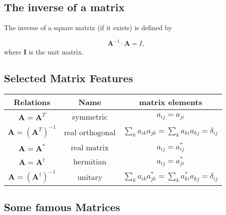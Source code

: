 \subsection{The inverse of a matrix}
\begin{block}{}
The inverse of a square matrix (if it exists) is defined by

\[
\bm{A}^{-1} \cdot \bm{A} = I,
\]
where $\bm{I}$ is the unit matrix.
\end{block}

\subsection{Selected Matrix Features}


{\footnotesize
\begin{tabular}{ccc}
\hline
\multicolumn{1}{c}{ Relations } & \multicolumn{1}{c}{ Name } & \multicolumn{1}{c}{ matrix elements } \\
\hline
$\bm{A} = \bm{A}^{T}$                            & symmetric       & $a_{ij} = a_{ji}$                                                       \\
$\bm{A} = \left (\bm{A}^{T} \right )^{-1}$       & real orthogonal & $\sum_k a_{ik} a_{jk} = \sum_k a_{ki} a_{kj} = \delta_{ij}$             \\
$\bm{A} = \bm{A}^{ * }$                          & real matrix     & $a_{ij} = a_{ij}^{ * }$                                                 \\
$\bm{A} = \bm{A}^{\dagger}$                      & hermitian       & $a_{ij} = a_{ji}^{ * }$                                                 \\
$\bm{A} = \left (\bm{A}^{\dagger} \right )^{-1}$ & unitary         & $\sum_k a_{ik} a_{jk}^{ * } = \sum_k a_{ki}^{ * } a_{kj} = \delta_{ij}$ \\
\hline
\end{tabular}
}

\noindent
\subsection{Some famous Matrices}

